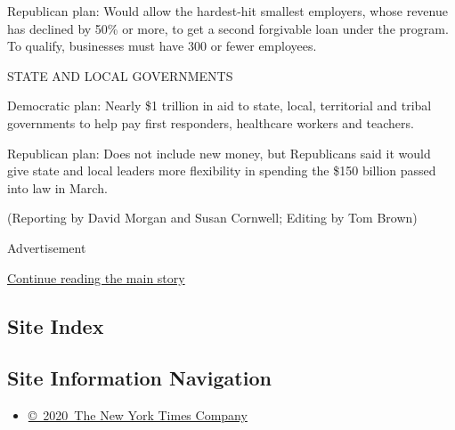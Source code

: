 Republican plan: Would allow the hardest-hit smallest employers, whose
revenue has declined by 50\% or more, to get a second forgivable loan
under the program. To qualify, businesses must have 300 or fewer
employees.

STATE AND LOCAL GOVERNMENTS

Democratic plan: Nearly \$1 trillion in aid to state, local, territorial
and tribal governments to help pay first responders, healthcare workers
and teachers.

Republican plan: Does not include new money, but Republicans said it
would give state and local leaders more flexibility in spending the
\$150 billion passed into law in March.

(Reporting by David Morgan and Susan Cornwell; Editing by Tom Brown)

Advertisement

\protect\hyperlink{after-bottom}{Continue reading the main story}

\hypertarget{site-index}{%
\subsection{Site Index}\label{site-index}}

\hypertarget{site-information-navigation}{%
\subsection{Site Information
Navigation}\label{site-information-navigation}}

\begin{itemize}
\tightlist
\item
  \href{https://help.nytimes.com/hc/en-us/articles/115014792127-Copyright-notice}{©~2020~The
  New York Times Company}
\end{itemize}

